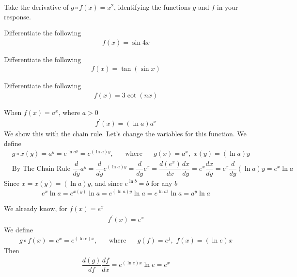 \begin{exercise}
Take the derivative of $g\circ f(x) = x^{2}$,  identifying the functions $g$ and $f$ in your response. 
\end{exercise}

\begin{exercise}
Differentiate the following
\begin{align*}
    f(x) = \sin 4x
\end{align*}
\end{exercise}

\begin{exercise}
Differentiate the following
\begin{align*}
    f(x) = \tan (\sin x)
\end{align*}
\end{exercise}

\begin{exercise}
Differentiate the following
\begin{align*}
    f(x) = 3\cot (nx)
\end{align*}
\end{exercise}

\begin{theorem}
When $f(x) = a^{x}$, where $a > 0$
\begin{align*}
    f^{'}(x) = (\ln a)a^{x}
\end{align*}
We show this with the chain rule. Let's change the variables for this function. We define
\begin{align*}
    &g\circ x(y) = a^{y} = e^{\ln a^{y}} = e^{(\ln a)y}, \hspace{20pt} \text{where} \hspace{20pt} g(x) = a^{x}, \hspace{4pt} x(y) = (\ln a)y\\[2ex]
    &\text{By The Chain Rule} \hspace{4pt} \dfrac{d}{dy} a^{y} = \dfrac{d}{dy} e^{(\ln a)y} = \dfrac{d}{dy} e^{x} = \dfrac{d(e^{x})}{dx} \dfrac{dx}{dy} = e^{x}\dfrac{dx}{dy} = e^{x} \dfrac{d}{dy} (\ln a)y = e^{x} \ln a
\end{align*}
Since $x = x(y) = (\ln a)y$, and since $e^{\ln b} = b$ for any $b$
\begin{align*}
    e^{x} \ln a = e^{x(y)} \ln a = e^{(\ln a)y} \ln a = e^{\ln a^{y}} \ln a = a^{y} \ln a
\end{align*}
\end{theorem}

\begin{example}
We already know, for $f(x) = e^{x}$
\begin{align*}
    f^{'}(x) = e^{x}
\end{align*}
We define
\begin{align*}
    g \circ f(x) = e^{x} = e^{(\ln e)x}, \hspace{20pt} \text{where} \hspace{20pt} g(f) = e^{f}, \hspace{4pt} f(x) = (\ln e)x
\end{align*}
Then 
\begin{align*}
    \dfrac{d(g)}{df} \dfrac{df}{dx} = e^{(\ln e)x}\ln e = e^{x}
\end{align*}
\end{example}


